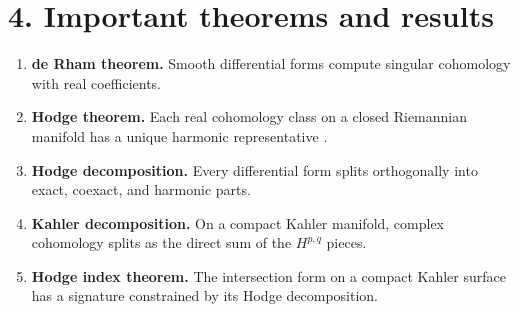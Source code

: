 \section*{4. Important theorems and results}
\begin{enumerate}[leftmargin=*,itemsep=0.35em]
\item \textbf{de Rham theorem.} Smooth differential forms compute singular cohomology with real coefficients.

\item \textbf{Hodge theorem.} Each real cohomology class on a closed Riemannian manifold has a unique harmonic representative \cite{hodge_theory_ref1}.

\item \textbf{Hodge decomposition.} Every differential form splits orthogonally into exact, coexact, and harmonic parts.

\item \textbf{Kahler decomposition.} On a compact Kahler manifold, complex cohomology splits as the direct sum of the $H^{p,q}$ pieces.

\item \textbf{Hodge index theorem.} The intersection form on a compact Kahler surface has a signature constrained by its Hodge decomposition.
\end{enumerate}

\theoryapplications
{}
